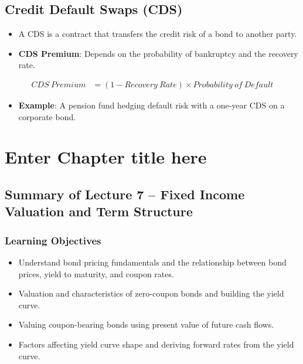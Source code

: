 \documentclass[
]{book}
\providecommand{\tightlist}{%
  \setlength{\itemsep}{0pt}\setlength{\parskip}{0pt}}
\begin{document}
\hypertarget{credit-default-swaps-cds}{%
\section{Credit Default Swaps (CDS)}\label{credit-default-swaps-cds}}

\begin{itemize}
\tightlist
\item
  A CDS is a contract that transfers the credit risk of a bond to
  another party.
\item
  \textbf{CDS Premium}: Depends on the probability of bankruptcy and the
  recovery rate.
\end{itemize}

\[
\begin{align}
CDS \ Premium &= (1 - Recovery \ Rate) \times Probability \ of \ Default
\end{align}
\]

\begin{itemize}
\tightlist
\item
  \textbf{Example}: A pension fund hedging default risk with a one-year
  CDS on a corporate bond.
\end{itemize}

\hypertarget{ch7}{%
\chapter{Enter Chapter title here}\label{ch7}}

\hypertarget{summary-of-lecture-7-fixed-income-valuation-and-term-structure}{%
\section{Summary of Lecture 7 -- Fixed Income Valuation and Term
Structure}\label{summary-of-lecture-7-fixed-income-valuation-and-term-structure}}

\hypertarget{learning-objectives-1}{%
\subsection{Learning Objectives}\label{learning-objectives-1}}

\begin{itemize}
\tightlist
\item
  Understand bond pricing fundamentals and the relationship between bond
  prices, yield to maturity, and coupon rates.
\item
  Valuation and characteristics of zero-coupon bonds and building the
  yield curve.
\item
  Valuing coupon-bearing bonds using present value of future cash flows.
\item
  Factors affecting yield curve shape and deriving forward rates from
  the yield curve.
\end{itemize}
\end{document}
